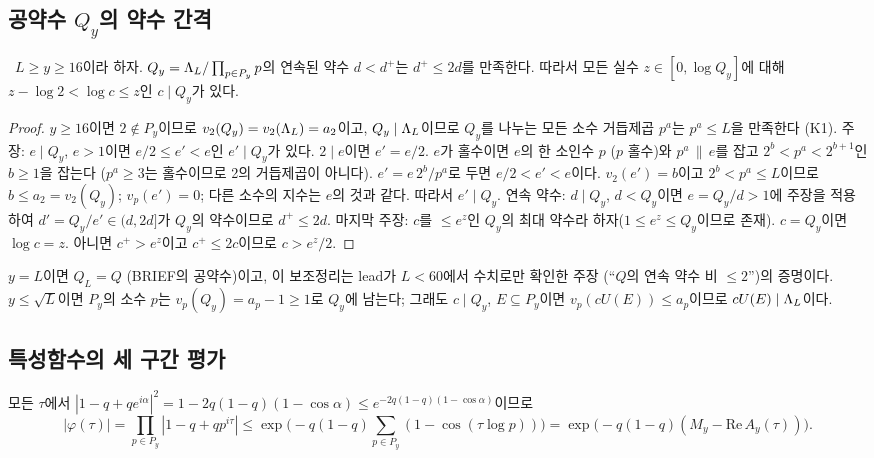 \subsection{공약수 $Q_y$의 약수 간격}
\label{VKGAP:sec-cofactor}

\begin{lemma}[공약수의 연속 약수 비 $\le2$]\label{VKGAP:lem-cofactor}
\PROVED\ $L\ge y\ge 16$이라 하자. $Q_y=\Lambda_L/\prod_{p\in P_y}p$의 연속된 약수 $d<d^+$는 $d^+\le 2d$를 만족한다.
따라서 모든 실수 $z\in[0,\log Q_y]$에 대해 $z-\log2<\log c\le z$인 $c\mid Q_y$가 있다.
\end{lemma}
\begin{proof}
$y\ge16$이면 $2\notin P_y$이므로 $v_2(Q_y)=v_2(\Lambda_L)=a_2$이고, $Q_y\mid\Lambda_L$이므로 $Q_y$를 나누는 모든 소수 거듭제곱
$p^a$는 $p^a\le L$을 만족한다 (K1).
주장: $e\mid Q_y$, $e>1$이면 $e/2\le e'<e$인 $e'\mid Q_y$가 있다. $2\mid e$이면 $e'=e/2$.
$e$가 홀수이면 $e$의 한 소인수 $p$ ($p$ 홀수)와 $p^a\,\|\,e$를 잡고 $2^b<p^a<2^{b+1}$인 $b\ge1$을 잡는다
($p^a\ge3$는 홀수이므로 2의 거듭제곱이 아니다). $e'=e\,2^b/p^a$로 두면 $e/2<e'<e$이다.
$v_2(e')=b$이고 $2^b<p^a\le L$이므로 $b\le a_2=v_2(Q_y)$; $v_p(e')=0$; 다른 소수의 지수는 $e$의 것과 같다.
따라서 $e'\mid Q_y$.
연속 약수: $d\mid Q_y$, $d<Q_y$이면 $e=Q_y/d>1$에 주장을 적용하여 $d'=Q_y/e'\in(d,2d]$가 $Q_y$의 약수이므로 $d^+\le 2d$.
마지막 주장: $c$를 $\le e^z$인 $Q_y$의 최대 약수라 하자($1\le e^z\le Q_y$이므로 존재). $c=Q_y$이면 $\log c=z$.
아니면 $c^+>e^z$이고 $c^+\le 2c$이므로 $c>e^z/2$.
\end{proof}

\begin{remark}\label{VKGAP:rem-cofactor}
$y=L$이면 $Q_L=Q$ (BRIEF의 공약수)이고, 이 보조정리는 lead가 $L<60$에서 수치로만 확인한 주장
(``$Q$의 연속 약수 비 $\le2$'')의 증명이다. $y\le\sqrt L$이면 $P_y$의 소수 $p$는 $v_p(Q_y)=a_p-1\ge1$로
$Q_y$에 남는다; 그래도 $c\mid Q_y$, $E\subseteq P_y$이면 $v_p(cU(E))\le a_p$이므로 $cU(E)\mid\Lambda_L$이다.
\end{remark}

\subsection{특성함수의 세 구간 평가}
\label{VKGAP:sec-charfun}

모든 $\tau$에서 $|1-q+qe^{i\alpha}|^2=1-2q(1-q)(1-\cos\alpha)\le e^{-2q(1-q)(1-\cos\alpha)}$이므로
\begin{equation}\label{VKGAP:eq-phi-basic}
|\varphi(\tau)|=\prod_{p\in P_y}|1-q+qp^{i\tau}|\le \exp\Big(-q(1-q)\sum_{p\in P_y}(1-\cos(\tau\log p))\Big)
=\exp\big(-q(1-q)(M_y-\mathrm{Re}\,A_y(\tau))\big).
\end{equation}

